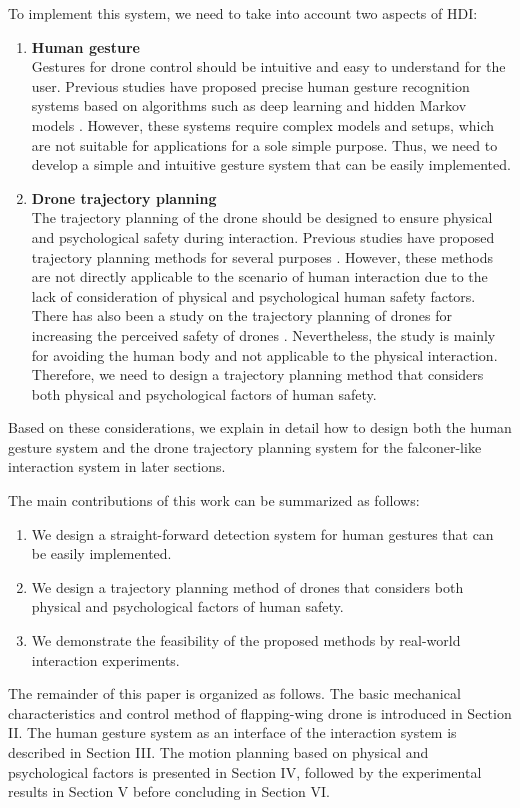 To implement this system, we need to take into account two aspects of HDI:
\begin{enumerate}
    \item \textbf{Human gesture}\\
    Gestures for drone control should be intuitive and easy to understand for the user.
    Previous studies have proposed precise human gesture recognition systems based on algorithms such as deep learning \cite{guo2021hand-gesture-recognition} and hidden Markov models \cite{Wilson1999parametric-HMM}.
    However, these systems require complex models and setups, which are not suitable for applications for a sole simple purpose.
    Thus, we need to develop a simple and intuitive gesture system that can be easily implemented.
    \item \textbf{Drone trajectory planning}\\
    The trajectory planning of the drone should be designed to ensure physical and psychological safety during interaction.
    Previous studies have proposed trajectory planning methods for several purposes \cite{sandino2021object-detection-uncertainty, rezaee2024drones-collision-avoidance}.
    However, these methods are not directly applicable to the scenario of human interaction due to the lack of consideration of physical and psychological human safety factors.
    There has also been a study on the trajectory planning of drones for increasing the perceived safety of drones \cite{van2023perceived-safety}.
    Nevertheless, the study is mainly for avoiding the human body and not applicable to the physical interaction.
    Therefore, we need to design a trajectory planning method that considers both physical and psychological factors of human safety.
\end{enumerate}
Based on these considerations, we explain in detail how to design both the human gesture system and the drone trajectory planning system for the falconer-like interaction system in later sections.

The main contributions of this work can be summarized as
follows:
\begin{enumerate}
    \item We design a straight-forward detection system for human gestures that can be easily implemented.
    \item We design a trajectory planning method of drones that considers both physical and psychological factors of human safety.
    \item We demonstrate the feasibility of the proposed methods by real-world interaction experiments.
\end{enumerate}

The remainder of this paper is organized as follows. 
The basic mechanical characteristics and control method of flapping-wing drone is introduced in Section II. 
The human gesture system as an interface of the interaction system is described in Section III.
The motion planning based on physical and psychological factors is presented in Section IV,
followed by the experimental results in Section V before concluding in Section VI.